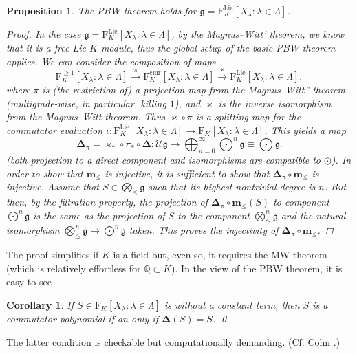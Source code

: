 \documentclass[11pt,a4paper]{amsart}
\newcommand{\snewpage}{}
\newcommand{\snewpage}{\newpage}
\newcommand{\snewpage}{}
\DeclareMathOperator{\Lie}{Lie}
\DeclareMathOperator{\cmr}{cmr}
\newcommand{\bo}{\boldsymbol}
\theoremstyle{definition}
\theoremstyle{plain}
\newtheorem{prop}[point]{Proposition}
\newtheorem{cor}[point]{Corollary}
\begin{document}
\begin{prop} The PBW theorem holds for  $\mathfrak g=\mathrm F_{K}^{\Lie}[X_\lambda:\lambda\in\Lambda]$.
\begin{proof}
In the case $\mathfrak g=\mathrm F_{K}^{\Lie}[X_\lambda:\lambda\in\Lambda]$, by the Magnus--Witt' theorem, we know that
 it is a free Lie $K$-module, thus the global setup of the basic PBW theorem applies.
We can consider the composition of maps
\[\mathrm F_{K}^{\geq 1}[X_\lambda:\lambda\in\Lambda]\xrightarrow{\pi}
\mathrm F_{K}^{\cmr}[X_\lambda:\lambda\in\Lambda]\xrightarrow{\varkappa}
\mathrm F_{K}^{\Lie}[X_\lambda:\lambda\in\Lambda],\]
 where $\pi$ is (the restriction of) a projection map from the Magnus--Witt'' theorem (multi\-gra\-de-wise, in particular, killing $1$),
 and $\varkappa$ is the inverse isomorphism from the Magnus--Witt theorem.
Thus $\varkappa\circ\pi$ is a splitting map for the commutator evaluation
 $\iota:\mathrm F_{K}^{\Lie}[X_\lambda:\lambda\in\Lambda]\rightarrow \mathrm F_{K} [X_\lambda:\lambda\in\Lambda]$.
This yields a map
\[\bo\Delta_\pi=\varkappa_*\circ \pi_*\circ\bo\Delta:\mathcal U\mathfrak g\rightarrow\bigoplus_{n=0}^\infty
\textstyle{\bigodot^n}\mathfrak g\equiv \textstyle{\bigodot}\mathfrak g.\]
 (both projection to a direct component and isomorphisms are compatible to $\odot$).
In order to show that $\bo m_\leq$ is injective, it is sufficient to show that $\bo\Delta_\pi\circ\bo m_\leq$ is injective.
Assume that $S\in \textstyle{\bigotimes_\leq\mathfrak g}$ such that its highest nontrivial degree is $n$.
But then, by the filtration property,
 the projection of $\bo\Delta_\pi\circ\bo m_\leq(S)$ to component $\textstyle{\bigodot^n}\mathfrak g  $
 is the same as the projection of $S$ to the component $\textstyle{\bigotimes^n_\leq}\mathfrak g$
 and the natural isomorphism $\textstyle{\bigotimes^n_\leq}\mathfrak g\rightarrow \textstyle{\bigodot^n}\mathfrak g $ taken.
This proves the injectivity of $\bo\Delta_\pi\circ\bo m_\leq$.
\end{proof}
\end{prop}
The proof simplifies if $K$ is a field but, even so, it requires the MW theorem
(which is relatively effortless for $\mathbb Q\subset K$).
In the view of the PBW theorem, it is easy to see
\begin{cor}
If $S\in \mathrm F_{K}[X_\lambda:\lambda\in\Lambda]$ is without a constant term, then
 $S$ is a commutator polynomial if an only if $\bo\Delta(S)=S$.
\qed
\end{cor}
The latter condition is checkable but computationally demanding.  (Cf. Cohn \cite{CC2}.)
\snewpage
\end{document}
